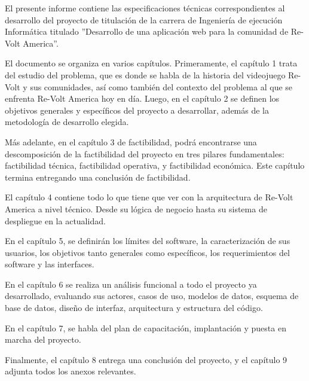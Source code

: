 El presente informe contiene las especificaciones técnicas correspondientes al desarrollo del proyecto de titulación de la carrera de Ingeniería de ejecución Informática titulado ''Desarrollo de una aplicación web para la comunidad de Re-Volt America''.

El documento se organiza en varios capítulos. Primeramente, el capítulo 1 trata del estudio del problema, que es donde se habla de la historia del videojuego Re-Volt y sus comunidades, así como también del contexto del problema al que se enfrenta Re-Volt America hoy en día. Luego, en el capítulo 2 se definen los objetivos generales y específicos del proyecto a desarrollar, además de la metodología de desarrollo elegida.

Más adelante, en el capítulo 3 de factibilidad, podrá encontrarse una descomposición de la factibilidad del proyecto en tres pilares fundamentales: factibilidad técnica, factibilidad operativa, y factibilidad económica. Este capítulo termina entregando una conclusión de factibilidad.

El capítulo 4 contiene todo lo que tiene que ver con la arquitectura de Re-Volt America a nivel técnico. Desde su lógica de negocio hasta su sistema de despliegue en la actualidad.

En el capítulo 5, se definirán los límites del software, la caracterización de sus usuarios, los objetivos tanto generales como específicos, los requerimientos del software y las interfaces.

En el capítulo 6 se realiza un análisis funcional a todo el proyecto ya desarrollado, evaluando sus actores, casos de uso, modelos de datos, esquema de base de datos, diseño de interfaz, arquitectura y estructura del código.

En el capítulo 7, se habla del plan de capacitación, implantación y puesta en marcha del proyecto.

Finalmente, el capítulo 8 entrega una conclusión del proyecto, y el capítulo 9 adjunta todos los anexos relevantes.